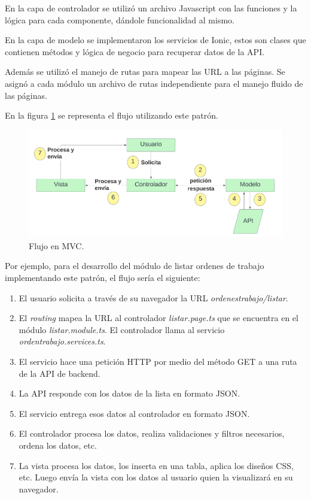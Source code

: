 En la capa de controlador se utilizó un archivo Javascript con las funciones y la lógica para cada componente, dándole funcionalidad al mismo. 

En la capa de modelo se implementaron los servicios de Ionic, estos son clases que contienen métodos y lógica de negocio para recuperar datos de la API. 

Además se utilizó el manejo de rutas para mapear las URL a las páginas. Se asignó a cada módulo un archivo de rutas independiente para el manejo fluido de las páginas.

En la figura \ref{fig:frontmvc} se representa el flujo utilizando este patrón. 

\begin{figure}[H]
	\centering
	\includegraphics[width=\textwidth]{./Figures/front-mvc.png}
	\caption{Flujo en MVC.}
	\label{fig:frontmvc}
\end{figure}

Por ejemplo, para el desarrollo del módulo de listar ordenes de trabajo implementando este patrón, el flujo sería el siguiente:

\begin{enumerate}
\item El usuario solicita a través de su navegador la URL \textit{ordenestrabajo/listar}.
\item El \textit{routing} mapea la URL al controlador \textit{listar.page.ts} que se encuentra en el módulo \textit{listar.module.ts}. El controlador llama al servicio \textit{ordentrabajo.services.ts}.
\item El servicio hace una petición HTTP por medio del método GET a una ruta de la API de backend. 
\item La API responde con los datos de la lista en formato JSON.
\item El servicio entrega esos datos al controlador en formato JSON.
\item El controlador procesa los datos, realiza validaciones y filtros necesarios, ordena los datos, etc.
\item La vista procesa los datos, los inserta en una tabla, aplica los diseños CSS, etc. Luego envía la vista con los datos al usuario quien la visualizará en su navegador. 
\end{enumerate}


